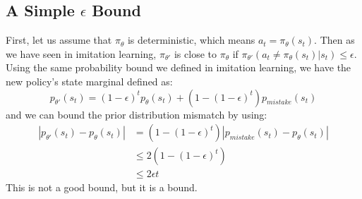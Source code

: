 \subsection{A Simple $\epsilon$ Bound}
First, let us assume that $\pi_\theta$ is deterministic, which means $a_t = \pi_\theta(s_t)$. Then as we have seen in imitation learning, $\pi_{\theta'}$ is close to $\pi_\theta$ if $\pi_{\theta'}(a_t\neq \pi_\theta(s_t)|s_t)\leq \epsilon$. Using the same probability bound we defined in imitation learning, we have the new policy's state marginal defined as:
$$p_{\theta'}(s_t) = (1-\epsilon)^tp_\theta(s_t) + (1-(1-\epsilon)^t)p_{mistake}(s_t)$$
and we can bound the prior distribution mismatch by using:
\begin{align*}
  |p_{\theta'}(s_t) - p_\theta(s_t)| &= (1-(1-\epsilon)^t)|p_{mistake}(s_t) - p_\theta(s_t)|\\
  &\leq 2(1-(1-\epsilon)^t)\\
  &\leq2\epsilon t
\end{align*}
This is not a good bound, but it is a bound.

